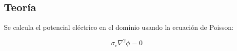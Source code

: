 \documentclass[a0,portrait]{a0poster}
\begin{document}
\begin{multicols}{2}
%
%


\section*{Teoría}

%
%


	Se calcula el potencial eléctrico en el dominio usando la ecuación de Poisson:

			\begin{equation}
				\sigma_{e} \nabla^2 \phi = 0
			\end{equation}\\



\end{multicols}
\end{document}
